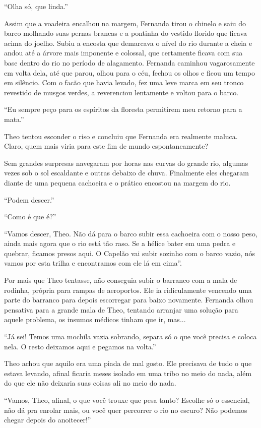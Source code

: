 ``Olha só, que linda.''

Assim que a voadeira encalhou na margem, Fernanda tirou o chinelo e saiu
do barco molhando suas pernas brancas e a pontinha do vestido florido
que ficava acima do joelho. Subiu a encosta que demarcava o nível do rio
durante a cheia e andou até a árvore mais imponente e colossal, que
certamente ficava com sua base dentro do rio no período de alagamento.
Fernanda caminhou vagarosamente em volta dela, até que parou, olhou para
o céu, fechou os olhos e ficou um tempo em silêncio. Com o facão que
havia levado, fez uma leve marca em seu tronco revestido de musgos
verdes, a reverenciou lentamente e voltou para o barco.

``Eu sempre peço para os espíritos da floresta permitirem meu retorno
para a mata.''

Theo tentou esconder o riso e concluiu que Fernanda era realmente
maluca. Claro, quem mais viria para este fim de mundo espontaneamente?

Sem grandes surpresas navegaram por horas nas curvas do grande rio,
algumas vezes sob o sol escaldante e outras debaixo de chuva. Finalmente
eles chegaram diante de uma pequena cachoeira e o prático encostou na
margem do rio.

``Podem descer.''

``Como é que é?''

``Vamos descer, Theo. Não dá para o barco subir essa cachoeira com o
nosso peso, ainda mais agora que o rio está tão raso. Se a hélice bater
em uma pedra e quebrar, ficamos presos aqui. O Capelão vai subir sozinho
com o barco vazio, nós vamos por esta trilha e encontramos com ele lá em
cima''.

Por mais que Theo tentasse, não conseguia subir o barranco com a mala de
rodinha, própria para rampas de aeroportos. Ele ia ridiculamente
vencendo uma parte do barranco para depois escorregar para baixo
novamente. Fernanda olhou pensativa para a grande mala de Theo, tentando
arranjar uma solução para aquele problema, os insumos médicos tinham que
ir, mas...

``Já sei! Temos uma mochila vazia sobrando, separa só o que você precisa
e coloca nela. O resto deixamos aqui e pegamos na volta.''

Theo achou que aquilo era uma piada de mal gosto. Ele precisava de tudo
o que estava levando, afinal ficaria meses isolado em uma tribo no meio
do nada, além do que ele não deixaria suas coisas ali no meio do nada.

``Vamos, Theo, afinal, o que você trouxe que pesa tanto? Escolhe só o
essencial, não dá pra enrolar mais, ou você quer percorrer o rio no
escuro? Não podemos chegar depois do anoitecer!''

